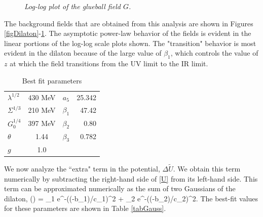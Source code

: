 \begin{figure}[htb]
\caption{\textit{Log-log plot of the glueball field $G$.}}
\label{figGlueball}
\end{figure}

The background fields that are obtained from this analysis are shown in Figures \ref{figDilaton}-\ref{figGlueball}. The asymptotic power-law behavior of the fields is evident in the linear portions of the log-log scale plots shown. The "transition" behavior is most evident in the dilaton because of the large value of $\beta_1$, which controls the value of $z$ at which the field transitions from the UV limit to the IR limit. 

\begin{table}[htb]
\begin{center}
\begin{tabular}{| l | c || c | r | }
\hline
  $\lambda^{1/2}$ & $430$ MeV & $a_5$ & 25.342 \\
  $\Sigma^{1/3}$ &  210 MeV & $\beta_1$ & 47.42\\
  $G_0^{1/4}$ & 397 MeV &  $\beta_2$ & 0.80 \\
 $ \theta $& 1.44 & $\beta_3$ & 0.782 \\
  $g $& 1.0 & & \\
  \hline
\end{tabular}
\caption{Best fit parameters}
\label{tabParam}
\end{center}
\end{table}


We now analyze the ``extra" term in the potential, $\Delta \tilde{U}$. 
We obtain this term numerically by subtracting the right-hand side of \ref{U} from its left-hand side.
This term can be approximated numerically as the sum of two Gaussians of the dilaton, 
\be
\Delta {}\left(\phi\right) = \alpha_1 e^{-\left(\left(\phi-b_1\right)/c_1\right)^2} + \alpha_2 e^{-\left(\left(\phi-b_2\right)/c_2\right)^2}.
\ee
The best-fit values for these parameters are shown in Table \ref{tabGauss}.

